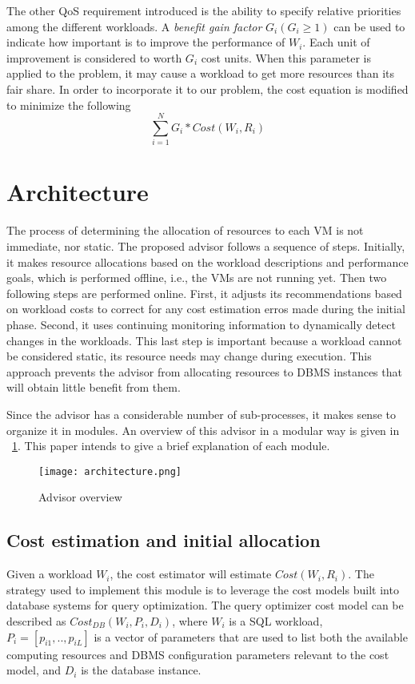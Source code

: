 The other QoS requirement introduced is the ability to specify relative priorities among the different workloads. A \textit{benefit gain factor} $G_{i} (G_{i} \geq 1)$ can be used to indicate how important is to improve the performance of $W_{i}$. Each unit of improvement is considered to worth $G_{i}$ cost units. When this parameter is applied to the problem, it may cause a workload to get more resources than its fair share. In order to incorporate it to our problem, the cost equation is modified to minimize the following
\[
  \sum_{i=1}^{N} G_{i} * Cost(W_{i},R_{i})
\]


\section{Architecture}

The process of  determining the allocation of resources to each VM is not immediate, nor static. The proposed advisor follows a sequence of steps. Initially, it makes resource allocations based on the workload descriptions and performance goals, which is performed offline, i.e., the VMs are not running yet. Then two following steps are performed online. First, it adjusts its recommendations based on workload costs to correct for any cost estimation erros made during the initial phase. Second, it uses continuing monitoring information to dynamically detect changes in the workloads. This last step is important because a workload cannot be considered static, its resource needs may change during execution. This approach prevents the advisor from allocating resources to DBMS instances that will obtain little benefit from them.

Since the advisor has a considerable number of sub-processes, it makes sense to organize it in modules. An overview of this advisor in a modular way is given in ~\ref{fig:architecture}. This paper intends to give a brief explanation of each module.


\begin{figure}[ht]
\centering
\texttt{[image: architecture.png]}
\caption{Advisor overview}
\label{fig:architecture}
\end{figure} 

\subsection{Cost estimation and initial allocation}

Given a workload $W_{i}$, the cost estimator will estimate $Cost(W_{i},R_{i})$. The strategy used to implement this module is to leverage the cost models built into database systems for query optimization. The query optimizer cost model can be described as $Cost_{DB}(W_{i},P_{i},D_{i})$, where $W_{i}$ is a SQL workload, $P_{i} = [p_{i1},..,p_{iL}]$ is a vector of parameters that are used to list both the available computing resources and DBMS configuration parameters relevant to the cost model, and $D_{i}$ is  the database instance. 

